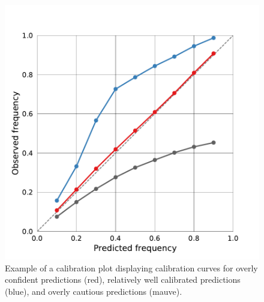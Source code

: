 \documentclass[journal abbreviation, manuscript]{copernicus}
\begin{document}
\begin{figure}[hbpt!]
  \centering
  \includegraphics[width = 0.5\linewidth]{../plots/calibration_plot_example}
  \caption{Example of a calibration plot displaying calibration curves for
           overly confident predictions (red), relatively well calibrated predictions (blue),
           and overly cautious predictions (mauve).}
  \label{fig:calibration_plot_example}
\end{figure}
\end{document}
